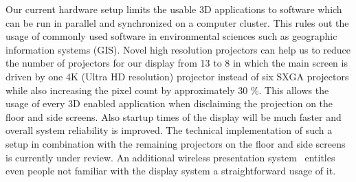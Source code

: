 \documentclass[twocolumn]{svjour3}          %
\newcommand{\myedit}[2]{\textcolor{red}{\st{#1}} \textcolor{blue}{#2}}
\begin{document}
Our current hardware setup limits the usable 3D applications to software which can be run in parallel and synchronized on a computer cluster. This rules out the usage of commonly used software in environmental sciences such as geographic information systems (GIS). Novel high resolution projectors can help us to reduce the number of projectors for our display from 13 to 8 in which the main screen is driven by one 4K (Ultra HD resolution) projector instead of six SXGA projectors while also increasing the pixel count by approximately 30 \%. This allows the usage of every 3D enabled application when disclaiming the projection on the floor and side screens. Also startup times of the display will be much faster and overall system reliability is improved. The technical implementation of such a setup in combination with the remaining projectors on the floor and side screens is currently under review. An additional wireless presentation system~\cite{web:clickshare} entitles even people not familiar with the display system a straightforward usage of it.





\end{document}
